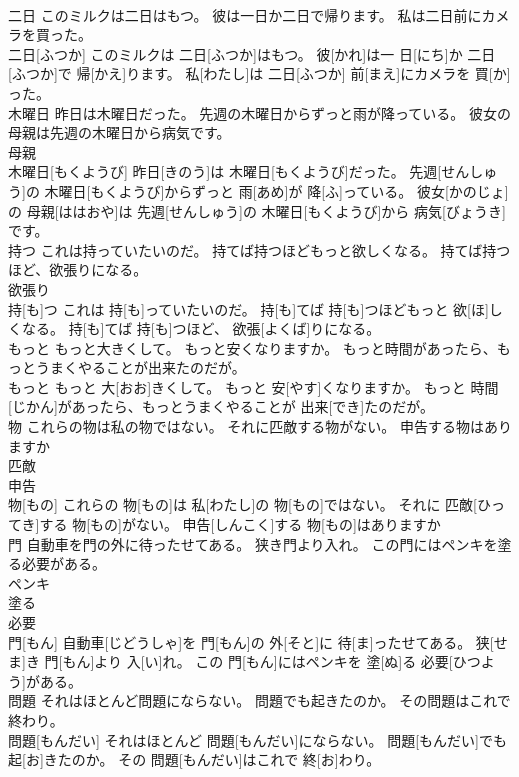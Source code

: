 \documentclass[8pt]{extreport}
\begin{document}
\begin{CJK}{UTF8}{min}
\\	二日 このミルクは二日はもつ。 彼は一日か二日で帰ります。 私は二日前にカメラを買った。	
\\	二日[ふつか] このミルクは 二日[ふつか]はもつ。 彼[かれ]は一 日[にち]か 二日[ふつか]で 帰[かえ]ります。 私[わたし]は 二日[ふつか] 前[まえ]にカメラを 買[か]った。
\\	木曜日 昨日は木曜日だった。 先週の木曜日からずっと雨が降っている。 彼女の母親は先週の木曜日から病気です。	
\\	母親 
\\	木曜日[もくようび] 昨日[きのう]は 木曜日[もくようび]だった。 先週[せんしゅう]の 木曜日[もくようび]からずっと 雨[あめ]が 降[ふ]っている。 彼女[かのじょ]の 母親[ははおや]は 先週[せんしゅう]の 木曜日[もくようび]から 病気[びょうき]です。
\\	持つ これは持っていたいのだ。 持てば持つほどもっと欲しくなる。 持てば持つほど、欲張りになる。	
\\	欲張り 
\\	持[も]つ これは 持[も]っていたいのだ。 持[も]てば 持[も]つほどもっと 欲[ほ]しくなる。 持[も]てば 持[も]つほど、 欲張[よくば]りになる。
\\	もっと もっと大きくして。 もっと安くなりますか。 もっと時間があったら、もっとうまくやることが出来たのだが。	
\\	もっと もっと 大[おお]きくして。 もっと 安[やす]くなりますか。 もっと 時間[じかん]があったら、もっとうまくやることが 出来[でき]たのだが。
\\	物 これらの物は私の物ではない。 それに匹敵する物がない。 申告する物はありますか	
\\	匹敵 
\\	申告 
\\	物[もの] これらの 物[もの]は 私[わたし]の 物[もの]ではない。 それに 匹敵[ひってき]する 物[もの]がない。 申告[しんこく]する 物[もの]はありますか
\\	門 自動車を門の外に待ったせてある。 狭き門より入れ。 この門にはペンキを塗る必要がある。	
\\	ペンキ 
\\	塗る 
\\	必要 
\\	門[もん] 自動車[じどうしゃ]を 門[もん]の 外[そと]に 待[ま]ったせてある。 狭[せま]き 門[もん]より 入[い]れ。 この 門[もん]にはペンキを 塗[ぬ]る 必要[ひつよう]がある。
\\	問題 それはほとんど問題にならない。 問題でも起きたのか。 その問題はこれで終わり。	
\\	問題[もんだい] それはほとんど 問題[もんだい]にならない。 問題[もんだい]でも 起[お]きたのか。 その 問題[もんだい]はこれで 終[お]わり。

\end{CJK}
\end{document}
